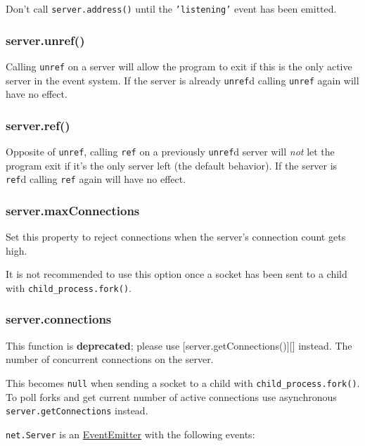 Don't call \texttt{server.address()} until the \texttt{'listening'}
event has been emitted.

\subsubsection{server.unref()}\label{server.unref}

Calling \texttt{unref} on a server will allow the program to exit if
this is the only active server in the event system. If the server is
already \texttt{unref}d calling \texttt{unref} again will have no
effect.

\subsubsection{server.ref()}\label{server.ref}

Opposite of \texttt{unref}, calling \texttt{ref} on a previously
\texttt{unref}d server will \emph{not} let the program exit if it's the
only server left (the default behavior). If the server is \texttt{ref}d
calling \texttt{ref} again will have no effect.

\subsubsection{server.maxConnections}\label{server.maxconnections}

Set this property to reject connections when the server's connection
count gets high.

It is not recommended to use this option once a socket has been sent to
a child with \texttt{child\_process.fork()}.

\subsubsection{server.connections}\label{server.connections}

This function is \textbf{deprecated}; please use
{[}server.getConnections(){]}{[}{]} instead. The number of concurrent
connections on the server.

This becomes \texttt{null} when sending a socket to a child with
\texttt{child\_process.fork()}. To poll forks and get current number of
active connections use asynchronous \texttt{server.getConnections}
instead.

\texttt{net.Server} is an
\href{events.html\#events_class_events_eventemitter}{EventEmitter} with
the following events:

